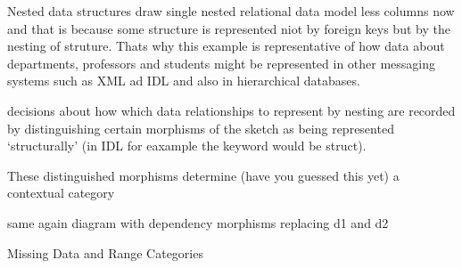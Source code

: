 \iffalse
\subsection{Example}
\begin{frame}{Example -- LCMSMS Data}
\scalebox{0.2}{

}
\pause
\vspace{-5cm}
\begin{block}{}
This diagram has representations of
\begin{itemize}
  \item a terminal object,
  \item 35 structurally implemented relationships, 
  \item 22 reference relationships implemented by foreign key,
  \item 5 coproducts,
  \item approx 15 commutative diagrams,
  \item xxx pullback diagrams.
\end{itemize}
Generated into code in XML, ECMA Javascript, Python.
\end{block}
\end{frame}
\fi

\begin{frame}{Nested data structures}
draw single nested relational data model
less columns now and that is because some structure is represented niot by foreign keys but by the nesting of struture. Thats why this example is representative of how data about departments, professors and students might be represented in other messaging systems such as XML ad IDL and also in hierarchical databases. 

decisions about how which data relationships to represent by nesting are recorded by distinguishing certain morphisms of the sketch as being represented `structurally'
(in IDL for eaxample the keyword would be struct).

These distinguished morphisms determine (have you guessed this yet) a contextual category 
\end{frame}

\begin{frame}
same again diagram with dependency morphisms replacing d1 and d2
\end{frame}

\begin{frame}{Missing Data and Range Categories}
\end{frame}

